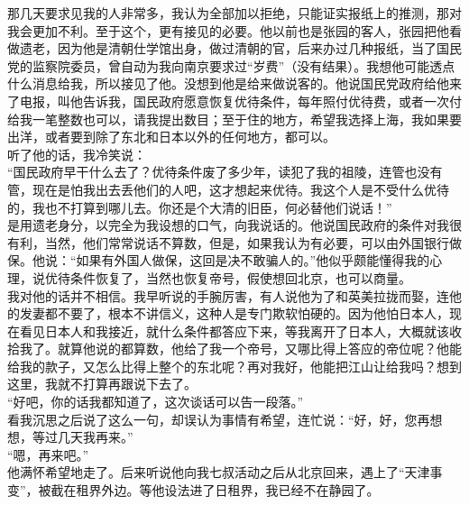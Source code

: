 那几天要求见我的人非常多，我认为全部加以拒绝，只能证实报纸上的推测，那对我会更加不利。至于这个，更有接见的必要。他以前也是张园的客人，张园把他看做遗老，因为他是清朝仕学馆出身，做过清朝的官，后来办过几种报纸，当了国民党的监察院委员，曾自动为我向南京要求过“岁费”（没有结果）。我想他可能透点什么消息给我，所以接见了他。没想到他是给来做说客的。他说国民党政府给他来了电报，叫他告诉我，国民政府愿意恢复优待条件，每年照付优待费，或者一次付给我一笔整数也可以，请我提出数目；至于住的地方，希望我选择上海，我如果要出洋，或者要到除了东北和日本以外的任何地方，都可以。\\

听了他的话，我冷笑说：\\

“国民政府早干什么去了？优待条件废了多少年，读犯了我的祖陵，连管也没有管，现在是怕我出去丢他们的人吧，这才想起来优待。我这个人是不受什么优待的，我也不打算到哪儿去。你还是个大清的旧臣，何必替他们说话！”\\

是用遗老身分，以完全为我设想的口气，向我说话的。他说国民政府的条件对我很有利，当然，他们常常说话不算数，但是，如果我认为有必要，可以由外国银行做保。他说：“如果有外国人做保，这回是决不敢骗人的。”他似乎颇能懂得我的心理，说优待条件恢复了，当然也恢复帝号，假使想回北京，也可以商量。\\

我对他的话并不相信。我早听说的手腕厉害，有人说他为了和英美拉拢而娶，连他的发妻都不要了，根本不讲信义，这种人是专门欺软怕硬的。因为他怕日本人，现在看见日本人和我接近，就什么条件都答应下来，等我离开了日本人，大概就该收拾我了。就算他说的都算数，他给了我一个帝号，又哪比得上答应的帝位呢？他能给我的款子，又怎么比得上整个的东北呢？再对我好，他能把江山让给我吗？想到这里，我就不打算再跟说下去了。\\

“好吧，你的话我都知道了，这次谈话可以告一段落。”\\

看我沉思之后说了这么一句，却误认为事情有希望，连忙说：“好，好，您再想想，等过几天我再来。”\\

“嗯，再来吧。”\\

他满怀希望地走了。后来听说他向我七叔活动之后从北京回来，遇上了“天津事变”，被截在租界外边。等他设法进了日租界，我已经不在静园了。\\

